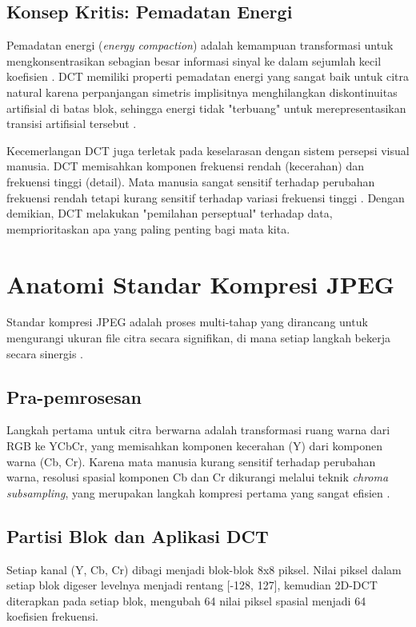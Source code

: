 \documentclass[a4paper]{article}
\begin{document}
\subsection{Konsep Kritis: Pemadatan Energi}
Pemadatan energi (\textit{energy compaction}) adalah kemampuan transformasi untuk mengkonsentrasikan sebagian besar informasi sinyal ke dalam sejumlah kecil koefisien \cite{saab_transform_arxiv}. DCT memiliki properti pemadatan energi yang sangat baik untuk citra natural karena perpanjangan simetris implisitnya menghilangkan diskontinuitas artifisial di batas blok, sehingga energi tidak "terbuang" untuk merepresentasikan transisi artifisial tersebut \cite{ucsd_dct_notes, samsung2018heecn}.

Kecemerlangan DCT juga terletak pada keselarasan dengan sistem persepsi visual manusia. DCT memisahkan komponen frekuensi rendah (kecerahan) dan frekuensi tinggi (detail). Mata manusia sangat sensitif terhadap perubahan frekuensi rendah tetapi kurang sensitif terhadap variasi frekuensi tinggi \cite{wallace1991jpeg}. Dengan demikian, DCT melakukan "pemilahan perseptual" terhadap data, memprioritaskan apa yang paling penting bagi mata kita.

\section{Anatomi Standar Kompresi JPEG}
Standar kompresi JPEG adalah proses multi-tahap yang dirancang untuk mengurangi ukuran file citra secara signifikan, di mana setiap langkah bekerja secara sinergis \cite{wallace1991jpeg}.

\subsection{Pra-pemrosesan}
Langkah pertama untuk citra berwarna adalah transformasi ruang warna dari RGB ke YCbCr, yang memisahkan komponen kecerahan (Y) dari komponen warna (Cb, Cr). Karena mata manusia kurang sensitif terhadap perubahan warna, resolusi spasial komponen Cb dan Cr dikurangi melalui teknik \textit{chroma subsampling}, yang merupakan langkah kompresi pertama yang sangat efisien \cite{wallace1991jpeg}.

\subsection{Partisi Blok dan Aplikasi DCT}
Setiap kanal (Y, Cb, Cr) dibagi menjadi blok-blok 8x8 piksel. Nilai piksel dalam setiap blok digeser levelnya menjadi rentang [-128, 127], kemudian 2D-DCT diterapkan pada setiap blok, mengubah 64 nilai piksel spasial menjadi 64 koefisien frekuensi.
\end{document}
